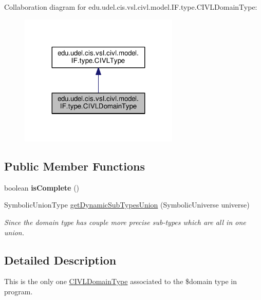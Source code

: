 Collaboration diagram for edu.\+udel.\+cis.\+vsl.\+civl.\+model.\+I\+F.\+type.\+C\+I\+V\+L\+Domain\+Type\+:
\nopagebreak
\begin{figure}[H]
\begin{center}
\leavevmode
\includegraphics[width=215pt]{interfaceedu_1_1udel_1_1cis_1_1vsl_1_1civl_1_1model_1_1IF_1_1type_1_1CIVLDomainType__coll__graph}
\end{center}
\end{figure}
\subsection*{Public Member Functions}
\begin{DoxyCompactItemize}
\item 
\hypertarget{interfaceedu_1_1udel_1_1cis_1_1vsl_1_1civl_1_1model_1_1IF_1_1type_1_1CIVLDomainType_a77b4211429727a6bafc010703aca6780}{}boolean {\bfseries is\+Complete} ()\label{interfaceedu_1_1udel_1_1cis_1_1vsl_1_1civl_1_1model_1_1IF_1_1type_1_1CIVLDomainType_a77b4211429727a6bafc010703aca6780}

\item 
Symbolic\+Union\+Type \hyperlink{interfaceedu_1_1udel_1_1cis_1_1vsl_1_1civl_1_1model_1_1IF_1_1type_1_1CIVLDomainType_a28c9fb3aa857b0e743eeb8ee0ca67337}{get\+Dynamic\+Sub\+Types\+Union} (Symbolic\+Universe universe)
\begin{DoxyCompactList}\small\item\em Since the domain type has couple more precise sub-\/types which are all in one union. \end{DoxyCompactList}\end{DoxyCompactItemize}


\subsection{Detailed Description}
This is the only one \hyperlink{interfaceedu_1_1udel_1_1cis_1_1vsl_1_1civl_1_1model_1_1IF_1_1type_1_1CIVLDomainType}{C\+I\+V\+L\+Domain\+Type} associated to the \$domain type in program. 

